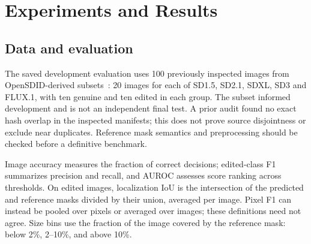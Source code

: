 \section{Experiments and Results}
\label{sec:results}

\subsection{Data and evaluation}
The saved development evaluation uses 100 previously inspected images from OpenSDID-derived subsets~\cite{opensdi}: 20 images for each of SD1.5, SD2.1, SDXL, SD3 and FLUX.1, with ten genuine and ten edited in each group. The subset informed development and is not an independent final test. A prior audit found no exact hash overlap in the inspected manifests; this does not prove source disjointness or exclude near duplicates. Reference mask semantics and preprocessing should be checked before a definitive benchmark.

Image accuracy measures the fraction of correct decisions; edited-class F1 summarizes precision and recall, and AUROC assesses score ranking across thresholds. On edited images, localization IoU is the intersection of the predicted and reference masks divided by their union, averaged per image. Pixel F1 can instead be pooled over pixels or averaged over images; these definitions need not agree. Size bins use the fraction of the image covered by the reference mask: below 2\%, 2--10\%, and above 10\%.

